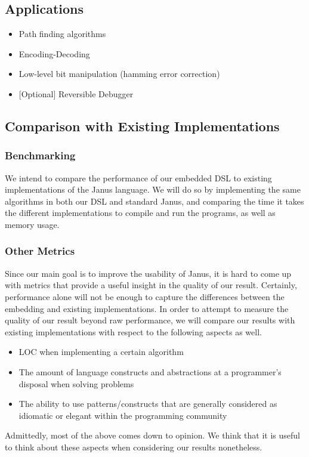 \documentclass[12pt,a4paper]{article}
\begin{document}
	\subsection{Applications}
	\begin{itemize}
		\item{Path finding algorithms}
        \item{Encoding-Decoding}
        \item{Low-level bit manipulation (hamming error correction)}
        \item{[Optional] Reversible Debugger}
	\end{itemize}
	
	\subsection{Comparison with Existing Implementations}
    \subsubsection{Benchmarking}
    We intend to compare the performance of our embedded DSL to existing implementations of the Janus language. We will do so by implementing the same algorithms in both our DSL and standard Janus, and comparing the time it takes the different implementations to compile and run the programs, as well as memory usage.
    \subsubsection{Other Metrics}
    Since our main goal is to improve the usability of Janus, it is hard to come up with metrics that provide a useful insight in the quality of our result. Certainly, performance alone will not be enough to capture the differences between the embedding and existing implementations. In order to attempt to measure the quality of our result beyond raw performance, we will compare our results with existing implementations with respect to the following aspects as well. 
	\begin{itemize}
		\item{LOC when implementing a certain algorithm}
		\item{The amount of language constructs and abstractions at a programmer's disposal when solving problems}
        \item{The ability to use patterns/constructs that are generally considered as idiomatic or elegant within the programming community}
	\end{itemize}
Admittedly, most of the above comes down to opinion. We think that it is useful to think about these aspects when considering our results nonetheless. 
	
\end{document}
